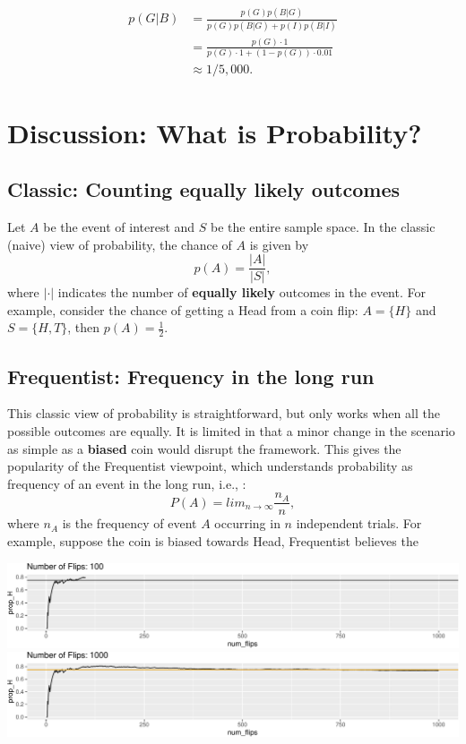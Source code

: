 \documentclass[
]{book}
\begin{document}
\[
\begin{aligned}
p(G|B) &=  \frac{p(G)p(B|G)}{p(G)p(B|G) + p(I)p(B|I)}\\
&= \frac{p(G)\cdot 1}{p(G)\cdot 1 + (1-p(G))\cdot 0.01}\\
&\approx 1/5,000.
\end{aligned}  
\]

\hypertarget{discussion-what-is-probability}{%
\section{Discussion: What is Probability?}\label{discussion-what-is-probability}}

\hypertarget{classic-counting-equally-likely-outcomes}{%
\subsection{Classic: Counting equally likely outcomes}\label{classic-counting-equally-likely-outcomes}}

Let \(A\) be the event of interest and \(S\) be the entire sample space. In the classic (naive) view of probability, the chance of \(A\) is given by
\[
p(A) = \frac{|A|}{|S|},
\]
where \(|\cdot|\) indicates the number of \textbf{equally likely} outcomes in the event. For example, consider the chance of getting a Head from a coin flip: \(A = \{H\}\) and \(S = \{H,T\}\), then \(p(A) = \frac{1}{2}\).

\hypertarget{frequentist-frequency-in-the-long-run}{%
\subsection{Frequentist: Frequency in the long run}\label{frequentist-frequency-in-the-long-run}}

This classic view of probability is straightforward, but only works when all the possible outcomes are equally. It is limited in that a minor change in the scenario as simple as a \textbf{biased} coin would disrupt the framework. This gives the popularity of the Frequentist viewpoint, which understands probability as frequency of an event in the long run, i.e., :
\[
P(A) = lim_{n\rightarrow \infty} \frac{n_A}{n},
\]
where \(n_A\) is the frequency of event \(A\) occurring in \(n\) independent trials. For example, suppose the coin is biased towards Head, Frequentist believes the

\includegraphics{_main_files/figure-latex/unnamed-chunk-9-1.pdf} \includegraphics{_main_files/figure-latex/unnamed-chunk-9-2.pdf}
\end{document}
